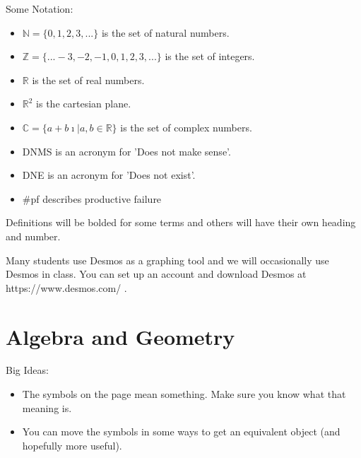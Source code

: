 Some Notation:
\begin{itemize}
\item $\mathbb{N}=\{0,1,2,3,...\}$ is the set of natural numbers.
\item $\mathbb{Z}=\{...-3,-2,-1,0,1,2,3,...\}$ is the set of integers.
\item $\mathbb{R}$ is the set of real numbers.
\item $\mathbb{R}^2$ is the cartesian plane.
\item $\mathbb{C}=\{a+b \imath | a,b \in \mathbb{R}\}$ is the set of complex numbers.
\item DNMS is an acronym for 'Does not make sense'.
\item DNE is an acronym for 'Does not exist'.
\item \#pf describes productive failure
\end{itemize}
Definitions will be bolded for some terms and others will have their own heading and number.

Many students use Desmos as a graphing tool and we will occasionally use Desmos in class. You can set up an account and download Desmos at https://www.desmos.com/ .


\mainmatter




\chapter{Algebra and Geometry}
\begin{annotation}
\end{annotation}
Big Ideas:
\begin{itemize}
\item The symbols on the page mean something. Make sure you know what that meaning is.
\item You can move the symbols in some ways to get an equivalent object (and hopefully more useful).
\end{itemize}

